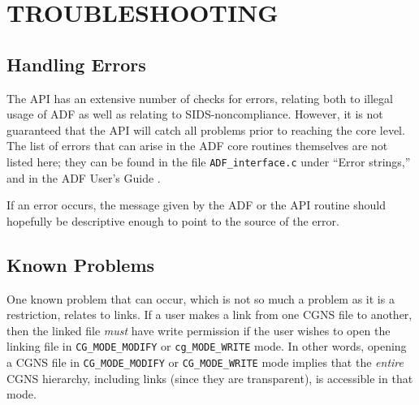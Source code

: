 \documentclass[12pt]{article}
\begin{document}
\newpage
\section{TROUBLESHOOTING} \label{sec:trouble}

\subsection{Handling Errors}

The API has an extensive number of checks for errors, relating
both to illegal usage of ADF as well as relating
to SIDS-noncompliance.
However, it is not guaranteed that
the API will catch all problems prior to reaching the core level.
The list of errors that can arise in the ADF core
routines themselves are not listed here; they
can be found in the file {\tt ADF\_interface.c} under
``Error strings,'' and in the ADF User's Guide \cite{CGNS1}.

If an error occurs, the message given by the ADF or the API
routine should hopefully be descriptive enough to point to the source
of the error.

\subsection{Known Problems}

One known problem that can occur, which is not so much a
problem as it is a restriction, relates to links.  If a user makes
a link from one CGNS file to another, then the linked file
{\it must} have write permission if the user wishes
to open the linking file in {\tt CG\_MODE\_MODIFY} or {\tt cg\_MODE\_WRITE} mode.
In other words, opening a CGNS file in {\tt CG\_MODE\_MODIFY} or {\tt CG\_MODE\_WRITE} mode
implies that the {\it entire} CGNS hierarchy, including links (since they are
transparent), is accessible in that mode.  

\end{document}
